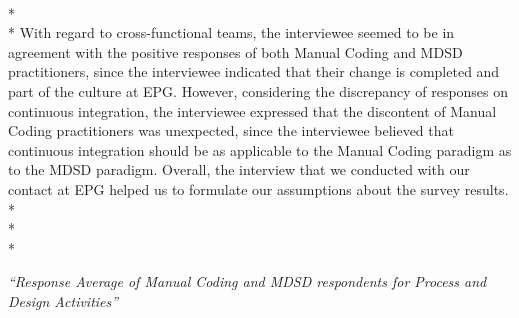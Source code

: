 \documentclass[final_report_innit.tex]{subfiles}
\begin{document}
\\* 
\\* 
With regard to cross-functional teams, the interviewee seemed to be in agreement with the positive responses of both Manual Coding and MDSD practitioners, since the interviewee indicated that their change is completed and part of the culture at EPG. However, considering the discrepancy of responses on continuous integration, the interviewee expressed that the discontent of Manual Coding practitioners was unexpected, since the interviewee believed that continuous integration should be as applicable to the Manual Coding paradigm as to the MDSD paradigm. Overall, the interview that we conducted with our contact at EPG helped us to formulate our assumptions about the survey results. 
\\* 
\\* 
\\* 

\textit{``Response Average of Manual Coding and MDSD respondents for Process and Design Activities''}
\end{document}
